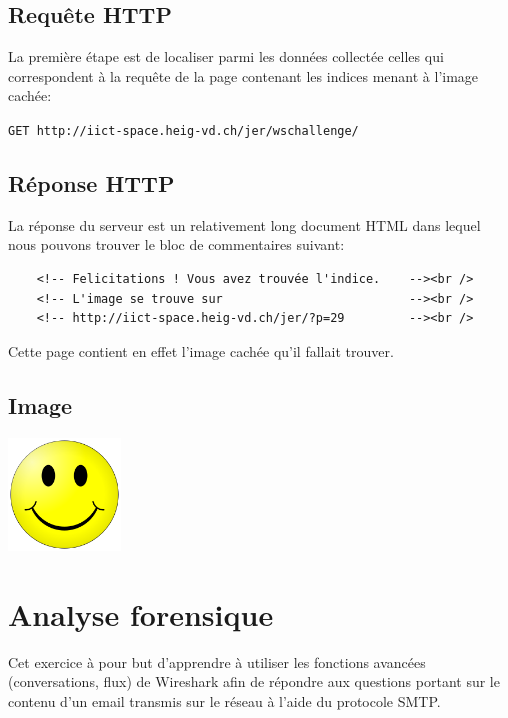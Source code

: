 \documentclass[11pt,a4paper]{article}
\begin{document}
\subsection{Requête HTTP}

La première étape est de localiser parmi les données collectée celles qui correspondent à la requête de la page contenant les indices menant à l'image cachée:

\texttt{GET http://iict-space.heig-vd.ch/jer/wschallenge/}

\subsection{Réponse HTTP}

La réponse du serveur est un relativement long document HTML dans lequel nous pouvons trouver le bloc de commentaires suivant:

\begin{verbatim}
	<!-- Felicitations ! Vous avez trouvée l'indice.    --><br />
	<!-- L'image se trouve sur                          --><br />
	<!-- http://iict-space.heig-vd.ch/jer/?p=29         --><br />
\end{verbatim}

Cette page contient en effet l'image cachée qu'il fallait trouver.

\subsection{Image}

\begin{center}
\includegraphics[width=3cm]{img_cachee}
\end{center}

\section{Analyse forensique}

Cet exercice à pour but d'apprendre à utiliser les fonctions avancées (conversations, flux) de Wireshark afin de répondre aux questions portant sur le contenu d'un email transmis sur le réseau à l'aide du protocole SMTP.
\end{document}

